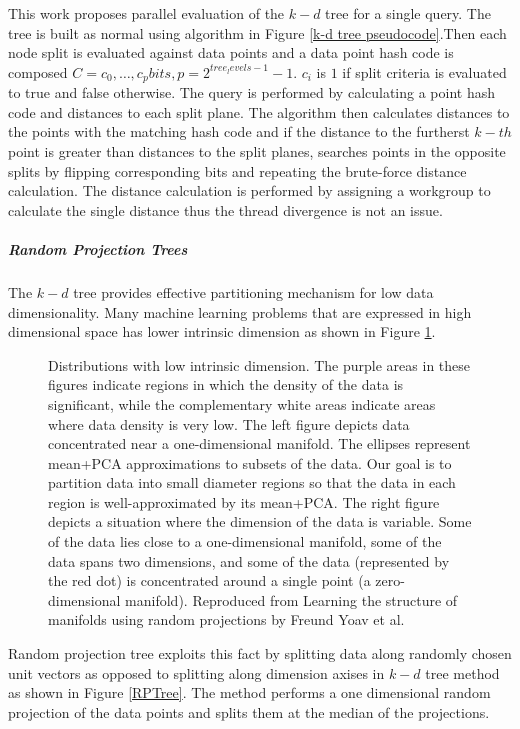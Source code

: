 This work proposes parallel evaluation of the $ k-d $ tree for a single query.
The tree is built as normal using algorithm in Figure \ref{k-d tree
pseudocode}.Then each node split is evaluated against data points and a data
point hash code is composed $ C = {c_0, \ldots , c_p} bits, p =
2^{tree_levels-1} - 1 $. $c_i$ is $ 1 $ if split criteria is evaluated to true and false otherwise. 
The query is performed by calculating a point hash code and distances to each
split plane. 
The algorithm then calculates distances to the points with the matching hash
code and if the distance to the furtherst $k-th$ point is greater than distances
to the split planes, searches points in the opposite splits by flipping
corresponding bits and repeating the brute-force distance calculation.
The distance calculation is performed by assigning a workgroup to calculate the
single distance thus the thread divergence is not an issue. 

\subparagraph*{Random Projection Trees}

The $ k-d $ tree provides effective partitioning mechanism for
low data dimensionality. Many machine learning problems that are expressed
in high dimensional space has lower intrinsic dimension as shown in Figure
\ref{IntrinsicDimension}. 
\begin{figure}[htp] 
	\caption{\label{IntrinsicDimension}Distributions with low intrinsic dimension. The purple areas in these figures indicate regions in which
the density of the data is significant, while the complementary white areas indicate areas where data density is very
low. The left figure depicts data concentrated near a one-dimensional manifold. The ellipses represent mean+PCA
approximations to subsets of the data. Our goal is to partition data into small diameter regions so that the data in each
region is well-approximated by its mean+PCA. The right figure depicts a situation where the dimension of the data is
variable. Some of the data lies close to a one-dimensional manifold, some of the data spans two dimensions, and some
of the data (represented by the red dot) is concentrated around a single point
(a zero-dimensional manifold). Reproduced from Learning the structure of
manifolds using random projections by Freund Yoav et
al.\cite{FreundManifoldRandomProjection} }
\end{figure}
Random projection tree exploits this fact by splitting data along randomly
chosen unit vectors as opposed to splitting along dimension
axises in $ k-d$ tree method as shown in
Figure \ref{RPTree}\cite{FreundManifoldRandomProjection}. The method performs a
one dimensional random projection of the data points and splits them at 
the median of the projections.  

